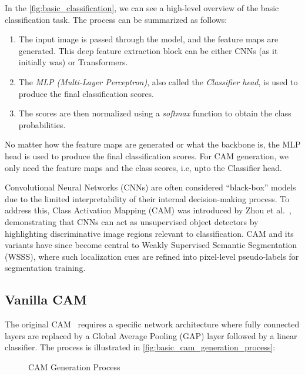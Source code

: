 In the \autoref{fig:basic_classification}, we can see a high-level overview of the basic classification task. The process can be summarized as follows:

\begin{enumerate}
    \item The input image is passed through the model, and the feature maps are generated. This deep feature extraction block can be either CNNs (as it initially was) or Transformers.
    \item The \emph{MLP (Multi-Layer Perceptron)}, also called the \emph{Classifier head}, is used to produce the final classification scores.
    \item The scores are then normalized using a \emph{softmax} function to obtain the class probabilities.
\end{enumerate}

No matter how the feature maps are generated or what the backbone is, the MLP head is used to produce the final classification scores. For CAM generation, we only need the feature maps and the class scores, i.e, upto the Classifier head.

Convolutional Neural Networks (CNNs) are often considered “black-box” models due to the limited interpretability of their internal decision-making process. To address this, Class Activation Mapping (CAM) was introduced by Zhou et al.~\cite{cam}, demonstrating that CNNs can act as unsupervised object detectors by highlighting discriminative image regions relevant to classification. CAM and its variants have since become central to Weakly Supervised Semantic Segmentation (WSSS), where such localization cues are refined into pixel-level pseudo-labels for segmentation training.

\subsection{Vanilla CAM}

The original CAM~\cite{cam} requires a specific network architecture where fully connected layers are replaced by a Global Average Pooling (GAP) layer followed by a linear classifier. The process is illustrated in \autoref{fig:basic_cam_generation_process}:

\begin{figure}[htbp]
    \centering
    \caption{CAM Generation Process}
    \label{fig:basic_cam_generation_process}
\end{figure}


